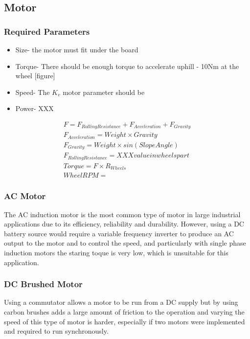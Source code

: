 \documentclass[journal,10pt]{IEEEtran}
\begin{document}
    \subsection{Motor}
        \subsubsection{Required Parameters}
        \begin{itemize}
        	\item Size- the motor must fit under the board
        	\item Torque- There should be enough torque to accelerate uphill - 10Nm at the wheel [figure]
        	\item Speed- The $K_{v}$ motor parameter should be 
        	\item Power- XXX
        \end{itemize}
        \begin{gather*}
            F = F_{Rolling Resistance} + F_{Acceleration} + F_{Gravity}
            \\F_{Acceleration} = Weight \times Gravity
            \\F_{Gravity} = Weight \times sin(Slope  Angle)
            \\F_{Rolling Resistance} = XXX value in wheels part
            \\Torque = F \times R_{Wheels}
            \\Wheel RPM = 
        \end{gather*}

        \subsubsection{AC Motor}
            The AC induction motor is the most common type of motor in large industrial applications due to its efficiency, reliability and durability. However, using a DC battery source would require a variable frequency inverter to produce an AC output to the motor and to control the speed, and particularly with single phase induction motors the staring toque is very low, which is unsuitable for this application. 
        \subsubsection{DC Brushed Motor}
            Using a commutator allows a motor to be run from a DC supply but by using carbon brushes adds a large amount of friction to the operation and varying the speed of this type of motor is harder, especially if two motors were implemented and required to run synchronously.
\end{document}
